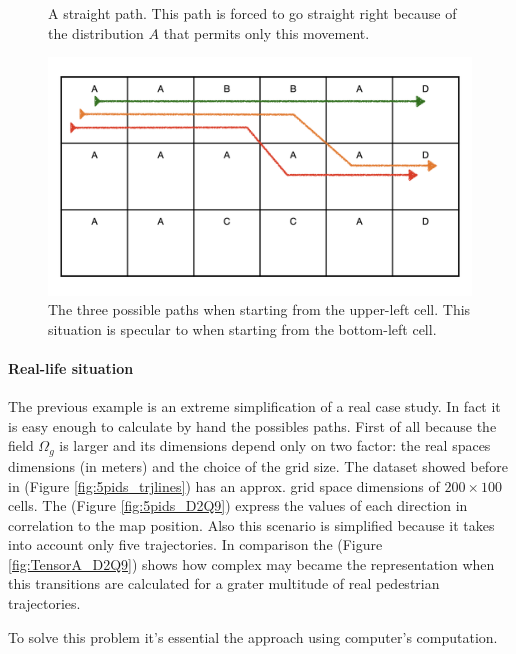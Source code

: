 \documentclass[class=article, crop=false]{standalone}
\begin{document}
\begin{figure}[ht]
\begin{minipage}[c]{0.5\linewidth}
\captionsetup{width=.8\linewidth}
\caption{A straight path. This path is forced to go straight right because of the distribution $A$ that permits only this movement.}
\label{fig:simplistic_example_4}
\end{minipage}
\begin{minipage}[c]{0.5\linewidth}
\centering
\includegraphics[scale=0.1]{draw/Thesis_plots/Thesis_plots.005}
\captionsetup{width=.8\linewidth}
\caption{The three possible paths when starting from the upper-left cell. This situation is specular to when starting from the bottom-left cell.}
\label{fig:simplistic_example_5}
\end{minipage}
\end{figure}

\paragraph{Real-life situation}
The previous example is an extreme simplification of a real case study.
In fact it is easy enough to calculate by hand the possibles paths.
First of all because the field $\Omega_g$ is larger and its dimensions depend only on two factor: the real spaces dimensions (in meters) and the choice of the grid size.
The dataset showed before in (Figure \ref{fig:5pids_trjlines}) has an approx. grid space dimensions of $200 \times 100$ cells.
The (Figure \ref{fig:5pids_D2Q9}) express the values of each direction in correlation to the map position.
Also this scenario is simplified because it takes into account only five trajectories.
In comparison the (Figure \ref{fig:TensorA_D2Q9}) shows how complex may became the representation when this transitions are calculated for a grater multitude of real pedestrian trajectories.

To solve this problem it's essential the approach using computer's computation.
\end{document}
